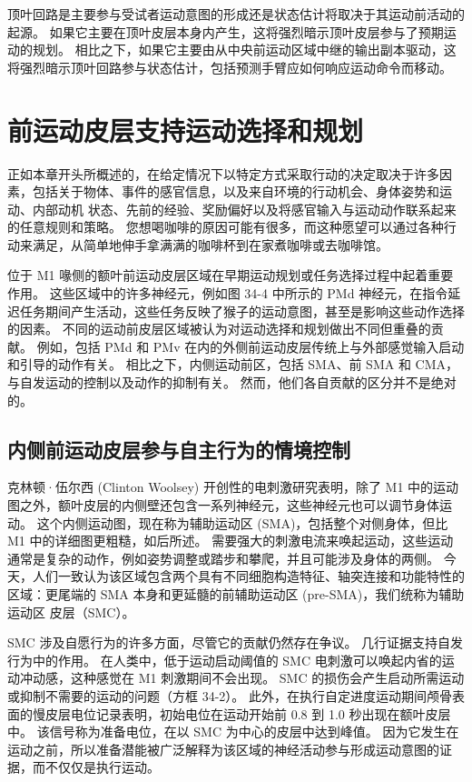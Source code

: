 顶叶回路是主要参与受试者运动意图的形成还是状态估计将取决于其运动前活动的起源。 如果它主要在顶叶皮层本身内产生，这将强烈暗示顶叶皮层参与了预期运动的规划。 相比之下，如果它主要由从中央前运动区域中继的输出副本驱动，这将强烈暗示顶叶回路参与状态估计，包括预测手臂应如何响应运动命令而移动。



\section{前运动皮层支持运动选择和规划}
正如本章开头所概述的，在给定情况下以特定方式采取行动的决定取决于许多因素，包括关于物体、事件的感官信息，以及来自环境的行动机会、身体姿势和运动、内部动机 状态、先前的经验、奖励偏好以及将感官输入与运动动作联系起来的任意规则和策略。 您想喝咖啡的原因可能有很多，而这种愿望可以通过各种行动来满足，从简单地伸手拿满满的咖啡杯到在家煮咖啡或去咖啡馆。

位于 M1 喙侧的额叶前运动皮层区域在早期运动规划或任务选择过程中起着重要作用。 这些区域中的许多神经元，例如图 34-4 中所示的 PMd 神经元，在指令延迟任务期间产生活动，这些任务反映了猴子的运动意图，甚至是影响这些动作选择的因素。 不同的运动前皮层区域被认为对运动选择和规划做出不同但重叠的贡献。 例如，包括 PMd 和 PMv 在内的外侧前运动皮层传统上与外部感觉输入启动和引导的动作有关。 相比之下，内侧运动前区，包括 SMA、前 SMA 和 CMA，与自发运动的控制以及动作的抑制有关。 然而，他们各自贡献的区分并不是绝对的。


\subsection{内侧前运动皮层参与自主行为的情境控制}

克林顿·伍尔西 (Clinton Woolsey) 开创性的电刺激研究表明，除了 M1 中的运动图之外，额叶皮层的内侧壁还包含一系列神经元，这些神经元也可以调节身体运动。 这个内侧运动图，现在称为辅助运动区 (SMA)，包括整个对侧身体，但比 M1 中的详细图更粗糙，如后所述。 需要强大的刺激电流来唤起运动，这些运动通常是复杂的动作，例如姿势调整或踏步和攀爬，并且可能涉及身体的两侧。 今天，人们一致认为该区域包含两个具有不同细胞构造特征、轴突连接和功能特性的区域：更尾端的 SMA 本身和更延髓的前辅助运动区 (pre-SMA)，我们统称为辅助运动区 皮层（SMC）。

SMC 涉及自愿行为的许多方面，尽管它的贡献仍然存在争议。 几行证据支持自发行为中的作用。 在人类中，低于运动启动阈值的 SMC 电刺激可以唤起内省的运动冲动感，这种感觉在 M1 刺激期间不会出现。 SMC 的损伤会产生启动所需运动或抑制不需要的运动的问题（方框 34-2）。 此外，在执行自定进度运动期间颅骨表面的慢皮层电位记录表明，初始电位在运动开始前 0.8 到 1.0 秒出现在额叶皮层中。 该信号称为准备电位，在以 SMC 为中心的皮层中达到峰值。 因为它发生在运动之前，所以准备潜能被广泛解释为该区域的神经活动参与形成运动意图的证据，而不仅仅是执行运动。

